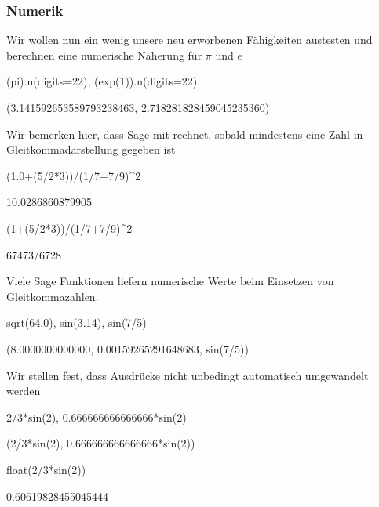 \documentclass[fontsize=12pt,paper=a4,twoside,bibtotoc,idxtotoc,
liststotoc,pagesize,BCOR1.2cm,DIV15,chapterprefix,pagesize=pdftex]{scrbook}
\theoremstyle{plain}
\theoremstyle{definition}
\theoremstyle{remark}
\begin{document}
\subsubsection{Numerik}
Wir wollen nun ein wenig unsere neu erworbenen Fähigkeiten austesten und berechnen eine numerische Näherung für $\pi$ und $e$
\begin{sagein}
(pi).n(digits=22), (exp(1)).n(digits=22)
\end{sagein}
\begin{sage}
(3.141592653589793238463, 2.718281828459045235360)
\end{sage}
Wir bemerken hier, dass Sage mit  rechnet, sobald mindestens eine Zahl in
Gleitkommadarstellung gegeben ist 
\begin{sagein}
(1.0+(5/2*3))/(1/7+7/9)^2
\end{sagein}
\begin{sage}
10.0286860879905
\end{sage}
\begin{sagein}
(1+(5/2*3))/(1/7+7/9)^2
\end{sagein}
\begin{sage}
67473/6728
\end{sage}
Viele Sage Funktionen liefern numerische Werte beim Einsetzen
     von Gleitkommazahlen.
\begin{sagein}
sqrt(64.0), sin(3.14), sin(7/5)
\end{sagein}
\begin{sage}
(8.0000000000000, 0.00159265291648683, sin(7/5))
\end{sage}
Wir stellen fest, dass Ausdrücke nicht unbedingt automatisch umgewandelt werden
\begin{sagein}
2/3*sin(2), 0.666666666666666*sin(2)
\end{sagein}
\begin{sage}
(2/3*sin(2), 0.666666666666666*sin(2))
\end{sage}
\begin{sagein}
float(2/3*sin(2))
\end{sagein}
\begin{sage}
0.60619828455045444
\end{sage}
\end{document}

